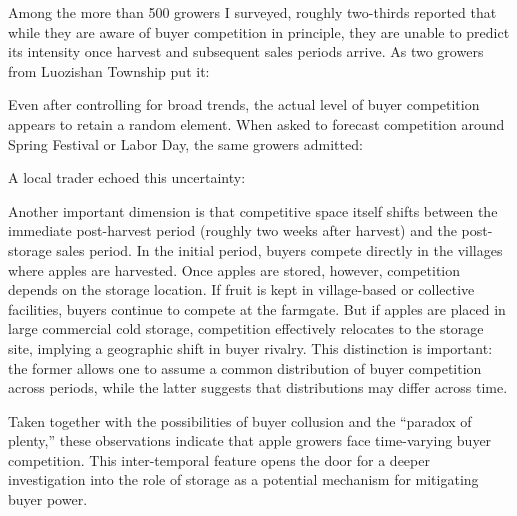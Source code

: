 Among the more than 500 growers I surveyed, roughly two-thirds reported that while they are aware of buyer competition in principle, they are unable to predict its intensity once harvest and subsequent sales periods arrive. As two growers from Luozishan Township put it: 
\begin{quote}  \end{quote}


Even after controlling for broad trends, the actual level of buyer competition appears to retain a random element. When asked to forecast competition around Spring Festival or Labor Day, the same growers admitted: 
\begin{quote}  \end{quote} A local trader echoed this uncertainty: 
\begin{quote}  \end{quote}

Another important dimension is that competitive space itself shifts between the immediate post-harvest period (roughly two weeks after harvest) and the post-storage sales period. In the initial period, buyers compete directly in the villages where apples are harvested. Once apples are stored, however, competition depends on the storage location. If fruit is kept in village-based or collective facilities, buyers continue to compete at the farmgate. But if apples are placed in large commercial cold storage, competition effectively relocates to the storage site, implying a geographic shift in buyer rivalry. This distinction is important: the former allows one to assume a common distribution of buyer competition across periods, while the latter suggests that distributions may differ across time.  

Taken together with the possibilities of buyer collusion and the “paradox of plenty,” these observations indicate that apple growers face time-varying buyer competition. This inter-temporal feature opens the door for a deeper investigation into the role of storage as a potential mechanism for mitigating buyer power.






